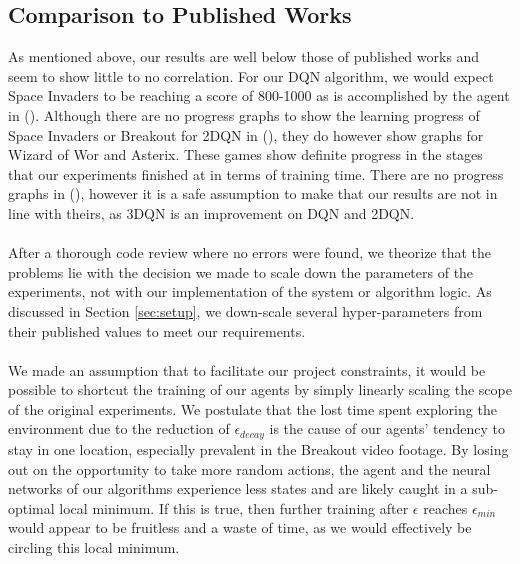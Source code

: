\subsection{Comparison to Published Works}
As mentioned above, our results are well below those of published works and seem to show little to no correlation. For our DQN algorithm, we would expect Space Invaders to be reaching a score of 800-1000 as is accomplished by the agent in (\citet{human}). Although there are no progress graphs to show the learning progress of Space Invaders or Breakout for 2DQN in (\citet{doubleq}), they do however show graphs for Wizard of Wor and Asterix. These games show definite progress in the stages that our experiments finished at in terms of training time. There are no progress graphs in (\citet{dueling}), however it is a safe assumption to make that our results are not in line with theirs, as 3DQN is an improvement on DQN and 2DQN. \paragraph{}

After a thorough code review where no errors were found, we theorize that the problems lie with the decision we made to scale down the parameters of the experiments, not with our implementation of the system or algorithm logic. As discussed in Section \ref{sec:setup}, we down-scale several hyper-parameters from their published values to meet our requirements. \paragraph{}

We made an assumption that to facilitate our project constraints, it would be possible to shortcut the training of our agents by simply linearly scaling the scope of the original experiments. We postulate that the lost time spent exploring the environment due to the reduction of $\epsilon_{decay}$ is the cause of our agents' tendency to stay in one location, especially prevalent in the Breakout video footage. By losing out on the opportunity to take more random actions, the agent and the neural networks of our algorithms experience less states and are likely caught in a sub-optimal local minimum. If this is true, then further training after $\epsilon$ reaches $\epsilon_{min}$ would appear to be fruitless and a waste of time, as we would effectively be circling this local minimum. \paragraph{}

